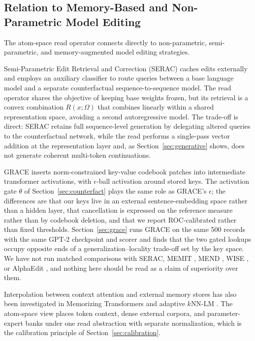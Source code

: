 \documentclass[preprint,12pt]{elsarticle}
\newcommand{\Om}{\Omega}
\begin{document}
\subsection{Relation to Memory-Based and Non-Parametric Model Editing}
The atom-space read operator connects directly to non-parametric, semi-parametric, and memory-augmented model editing strategies.

Semi-Parametric Edit Retrieval and Correction (SERAC) \cite{mitchell2022memory} caches edits externally and employs an auxiliary classifier to route queries between a base language model and a separate counterfactual sequence-to-sequence model. The read operator shares the objective of keeping base weights frozen, but its retrieval is a convex combination $R(x; \Om)$ that combines linearly within a shared representation space, avoiding a second autoregressive model. The trade-off is direct: SERAC retains full sequence-level generation by delegating altered queries to the counterfactual network, while the read performs a single-pass vector addition at the representation layer and, as Section~\ref{sec:generative} shows, does not generate coherent multi-token continuations.

GRACE \cite{hartvigsen2023aging} inserts norm-constrained key-value codebook patches into intermediate transformer activations, with $\epsilon$-ball activation around stored keys. The activation gate $\theta$ of Section~\ref{sec:counterfact} plays the same role as GRACE's $\epsilon$; the differences are that our keys live in an external sentence-embedding space rather than a hidden layer, that cancellation is expressed on the reference measure rather than by codebook deletion, and that we report ROC-calibrated rather than fixed thresholds. Section~\ref{sec:grace} runs GRACE on the same 500 records with the same GPT-2 checkpoint and scorer and finds that the two gated lookups occupy opposite ends of a generalization--locality trade-off set by the key space. We have not run matched comparisons with SERAC, MEMIT \cite{meng2023mass}, MEND \cite{mitchell2022fast}, WISE \cite{wang2024wise}, or AlphaEdit \cite{fang2025alphaedit}, and nothing here should be read as a claim of superiority over them.

Interpolation between context attention and external memory stores has also been investigated in Memorizing Transformers \cite{wu2022memorizing} and adaptive $k$NN-LM \cite{he2021efficient}. The atom-space view places token context, dense external corpora, and parameter-expert banks under one read abstraction with separate normalization, which is the calibration principle of Section~\ref{sec:calibration}.
\end{document}
